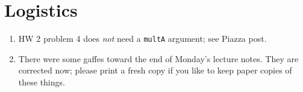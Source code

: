 \section{Logistics}

\begin{enumerate}
  \item HW 2 problem 4 does {\em not} need a {\tt multA} argument;
    see Piazza post.
  \item There were some gaffes toward the end of Monday's lecture
    notes.  They are corrected now; please print a fresh copy if you
    like to keep paper copies of these things.
\end{enumerate}
